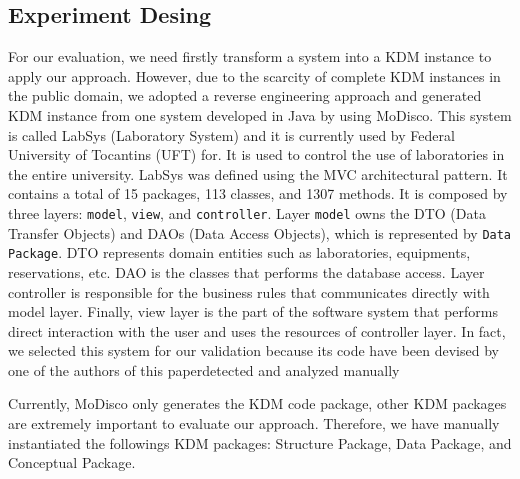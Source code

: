 \subsection{Experiment Desing}

For our evaluation, we need firstly transform a system into a KDM instance to apply our approach. However, due to the scarcity of complete KDM instances in the public domain, we adopted a reverse engineering approach and generated KDM instance from one system developed in Java by using MoDisco. This system is called LabSys (Laboratory System) and it is currently used by Federal University of Tocantins (UFT) for. It is used to control the use of laboratories in the entire university. %
%
%
LabSys  was defined using the MVC architectural pattern. It contains a total of 15 packages, 113 classes, and 1307 methods. It is composed by three layers: \texttt{model}, \texttt{view}, and \texttt{controller}. Layer \texttt{model} owns the  DTO (Data Transfer Objects) and DAOs (Data Access Objects), which is represented by \texttt{Data Package}. DTO represents domain entities such as laboratories, equipments, reservations, etc. DAO is the classes that performs the database access. Layer controller is responsible for the business rules that communicates directly with model layer. Finally, view layer is the part of the software system that performs direct interaction with the user and uses the resources of controller layer. In fact, we selected this system for our validation because its code have been devised by one of the authors of this paperdetected and analyzed manually

Currently, MoDisco only generates the KDM code package, other KDM packages are extremely important to evaluate our approach. Therefore, we have manually instantiated the followings KDM packages: Structure Package, Data Package, and Conceptual Package.

